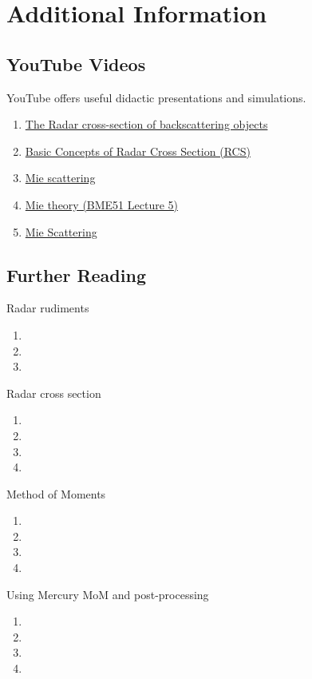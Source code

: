 % 

\section{Additional Information}

\subsection{YouTube Videos}
YouTube offers useful didactic presentations and simulations.
\begin{enumerate}
	\item \href{https://www.youtube.com/watch?v=ujyoJSzwmQw}{The Radar cross-section of backscattering objects}
	\item \href{https://www.youtube.com/watch?v=0g5x4pXBid8}{Basic Concepts of Radar Cross Section (RCS)}
	\item \href{https://www.youtube.com/watch?v=mM-QDN68ebc}{Mie scattering}
	\item \href{https://www.youtube.com/watch?v=ayI6W6-ypUM&list=PLzD7pNQo-MGzkBnp1HVTGXaIQzWvkJ0M8}{Mie theory (BME51 Lecture 5)}
	\item \href{https://www.youtube.com/shorts/ggMoo8wH1_o}{Mie Scattering}
\end{enumerate}

\subsection{Further Reading}
Radar rudiments
\begin{enumerate}
	\item {}
	\item {}
	\item {}
\end{enumerate}
Radar cross section
\begin{enumerate}
	\item {}
	\item {}
	\item {}
	\item {}
\end{enumerate}
Method of Moments
\begin{enumerate}
	\item {}
	\item {}
	\item {}
	\item {}
\end{enumerate}
Using Mercury MoM and post-processing
\begin{enumerate}
	\item {}
	\item {}
	\item {}
	\item {}
\end{enumerate}

\endinput  %